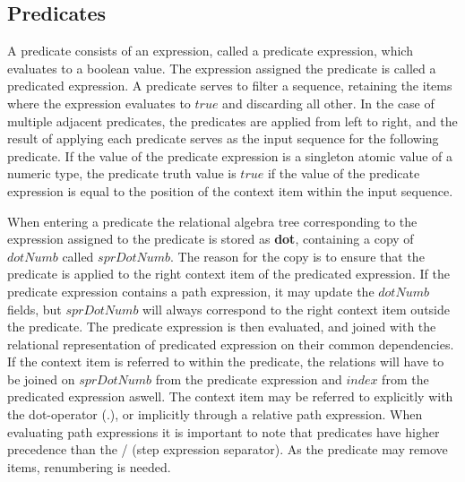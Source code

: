 \subsection{Predicates}
\label{sect:trans:TD:predicates}
A predicate consists of an expression, called a predicate expression, which evaluates to a boolean value. The
expression assigned the predicate is called a predicated expression. A predicate serves to filter a sequence,
retaining the items where the expression evaluates to $true$ and discarding all other. In the case of multiple
adjacent predicates, the predicates are applied from left to right, and the result of applying each predicate
serves as the input sequence for the following predicate. If the value of the predicate expression is a singleton
atomic value of a numeric type, the predicate truth value is $true$ if the value of the predicate expression is
equal to the position of the context item within the input sequence.

When entering a predicate the relational algebra tree corresponding to the expression assigned to the predicate is
stored as \textbf{dot}, containing a copy of $dotNumb$ called $sprDotNumb$. The reason for the copy is to ensure
that the predicate is applied to the right context item of the predicated expression. If the predicate
expression contains a path expression, it may update the $dotNumb$ fields, but $sprDotNumb$ will always correspond
to the right context item outside the predicate. The predicate expression is then evaluated, and joined with
the relational representation of predicated expression on their common dependencies. If the context item is
referred to within the predicate, the relations will have to be joined on $sprDotNumb$ from the predicate
expression and $index$ from the predicated expression aswell. The context item may be referred to explicitly with
the dot-operator (.), or implicitly through a relative path expression. When evaluating path expressions it is
important to note that predicates have higher precedence than the / (step expression separator). As the predicate may remove items, renumbering is needed.

